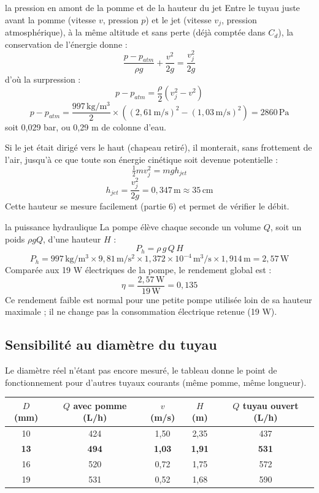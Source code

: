 \documentclass[11pt,a4paper]{article}
\newcommand{\U}[1]{\,\mathrm{#1}}
\begin{document}
\begin{calcul}{la pression en amont de la pomme et de la hauteur du jet}
Entre le tuyau juste avant la pomme (vitesse $v$, pression $p$) et le jet (vitesse $v_j$, pression atmosphérique), à la même altitude et sans perte (déjà comptée dans $C_d$), la conservation de l'énergie donne :
\[ \frac{p - p_{atm}}{\rho g} + \frac{v^2}{2g} = \frac{v_j^2}{2g} \]
d'où la surpression :
\[ p - p_{atm} = \frac{\rho}{2}\left(v_j^2 - v^2\right) \]
\[ p - p_{atm} = \frac{997\U{kg/m^3}}{2}\times\left((2{,}61\U{m/s})^2 - (1{,}03\U{m/s})^2\right) = 2860\U{Pa} \]
soit 0,029 bar, ou 0,29 m de colonne d'eau.

Si le jet était dirigé vers le haut (chapeau retiré), il monterait, sans frottement de l'air, jusqu'à ce que toute son énergie cinétique soit devenue potentielle :
\[ \tfrac12 m v_j^2 = m g h_{jet} \]
\[ h_{jet} = \frac{v_j^2}{2g} = 0{,}347\U{m} \approx 35\U{cm} \]
Cette hauteur se mesure facilement (partie 6) et permet de vérifier le débit.
\end{calcul}

\begin{calcul}{la puissance hydraulique}
La pompe élève chaque seconde un volume $Q$, soit un poids $\rho g Q$, d'une hauteur $H$ :
\[ P_h = \rho\,g\,Q\,H \]
\[ P_h = 997\U{kg/m^3} \times 9{,}81\U{m/s^2} \times 1{,}372\times10^{-4}\U{m^3/s} \times 1{,}914\U{m} = 2{,}57\U{W} \]
Comparée aux 19 W électriques de la pompe, le rendement global est :
\[ \eta = \frac{2{,}57\U{W}}{19\U{W}} = 0{,}135 \]
Ce rendement faible est normal pour une petite pompe utilisée loin de sa hauteur maximale ; il ne change pas la consommation électrique retenue (19 W).
\end{calcul}

\subsection{Sensibilité au diamètre du tuyau}

Le diamètre réel n'étant pas encore mesuré, le tableau donne le point de fonctionnement pour d'autres tuyaux courants (même pomme, même longueur).

\begin{center}
\begin{tabular}{ccccc}
\toprule
$D$ (mm) & $Q$ avec pomme (L/h) & $v$ (m/s) & $H$ (m) & $Q$ tuyau ouvert (L/h) \\
\midrule
10 & 424 & 1,50 & 2,35 & 437 \\
\textbf{13} & \textbf{494} & \textbf{1,03} & \textbf{1,91} & \textbf{531} \\
16 & 520 & 0,72 & 1,75 & 572 \\
19 & 531 & 0,52 & 1,68 & 590 \\
\bottomrule
\end{tabular}
\end{center}
\end{document}
